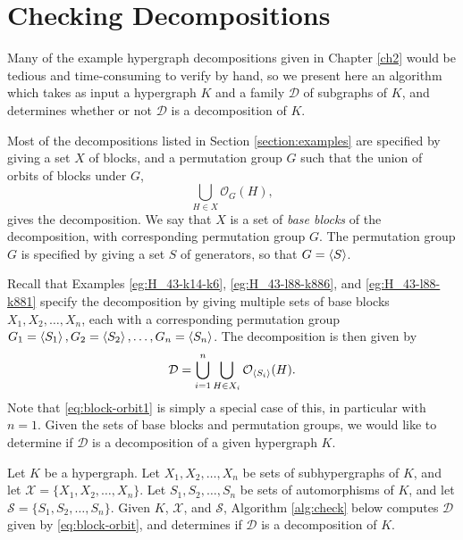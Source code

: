 \section{Checking Decompositions}

Many of the example hypergraph decompositions given in Chapter \ref{ch2} would be tedious and time-consuming to verify by hand, so we present here an algorithm which takes as input a hypergraph $K$ and a family $\mathcal{D}$ of subgraphs of $K$, and determines whether or not $\mathcal{D}$ is a decomposition of $K$.

Most of the decompositions listed in Section \ref{section:examples} are specified by giving a set $X$ of blocks, and a permutation group $G$ such that the union of orbits of blocks under $G$,
\begin{equation} \label{eq:block-orbit1}
    \bigcup_{H \in X} \mathcal{O}_G(H),
\end{equation}
gives the decomposition.
We say that $X$ is a set of {\em base blocks} of the decomposition, with corresponding permutation group $G$.
The permutation group $G$ is specified by giving a set $S$ of generators, so that $G = \left\langle S \right\rangle$.

Recall that Examples \ref{eg:H_43-k14-k6}, \ref{eg:H_43-l88-k886}, and \ref{eg:H_43-l88-k881} specify the decomposition by giving multiple sets of base blocks $X_1, X_2, \ldots, X_n$, each with a corresponding permutation group $G_1 = \left\langle S_1 \right\rangle, G_2 = \left\langle S_2 \right\rangle, \ldots, G_n = \left\langle S_n \right\rangle$.
The decomposition is then given by
\begin{equation} \label{eq:block-orbit}
    \mathcal{D} = \bigcup_{i = 1}^{n} \bigcup_{H \in X_i} \mathcal{O}_{\left\langle S_i \right\rangle}(H).
\end{equation}
Note that \eqref{eq:block-orbit1} is simply a special case of this, in particular with $n = 1$.
Given the sets of base blocks and permutation groups, we would like to determine if $\mathcal{D}$ is a decomposition of a given hypergraph $K$.

Let $K$ be a hypergraph.
Let $X_1, X_2, \ldots, X_n$ be sets of subhypergraphs of $K$, and let $\mathcal{X} = \{X_1, X_2, \ldots, X_n\}$.
Let $S_1, S_2, \ldots, S_n$ be sets of automorphisms of $K$, and let $\mathcal{S} = \{S_1, S_2, \ldots, S_n\}$.
Given $K$, $\mathcal{X}$, and $\mathcal{S}$, Algorithm \ref{alg:check} below computes $\mathcal{D}$ given by \eqref{eq:block-orbit}, and determines if $\mathcal{D}$ is a decomposition of $K$.

